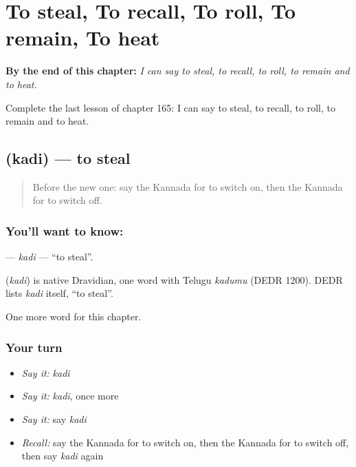 
\chapter{To steal, To recall, To roll, To remain, To heat}
\label{ch:ka-to-steal-to-recall-to-roll-to-remain-to-heat}

\begin{chapteropening}
\textbf{By the end of this chapter:} \emph{I can say to steal, to recall, to roll, to remain and to heat.}

Complete the last lesson of chapter 165: I can say to steal, to recall, to roll, to remain and to heat.
\end{chapteropening}

\section[\texorpdfstring{\kn{ಕದಿ} (kadi)}{ಕದಿ (kadi)}]{ (kadi) — to steal}

\label{lesson:KA-C165-kadi}



\begin{quote}
Before the new one: say the Kannada for to switch on, then the Kannada for to switch off.
\end{quote}

\subsection*{You'll want to know: }
\textbf{} — \emph{kadi} — \textquotedblleft{}to steal\textquotedblright{}.

\begin{cousinweb}
\textbf{} (\emph{kadi}) is native Dravidian, one word with Telugu \emph{kadumu} (DEDR 1200). DEDR lists \emph{kadi} itself, \textquotedblleft{}to steal\textquotedblright{}.
\end{cousinweb}

\begin{grammarlens}[title={What you've built}]
One more word for this chapter.
\end{grammarlens}

\subsection*{Your turn}
\begin{itemize}
\raggedright
  \item \emph{Say it:} \emph{kadi}
  \item \emph{Say it:} \emph{kadi}, once more
  \item \emph{Say it:} say \emph{kadi}
  \item \emph{Recall:} say the Kannada for to switch on, then the Kannada for to switch off, then say \emph{kadi} again
\end{itemize}

